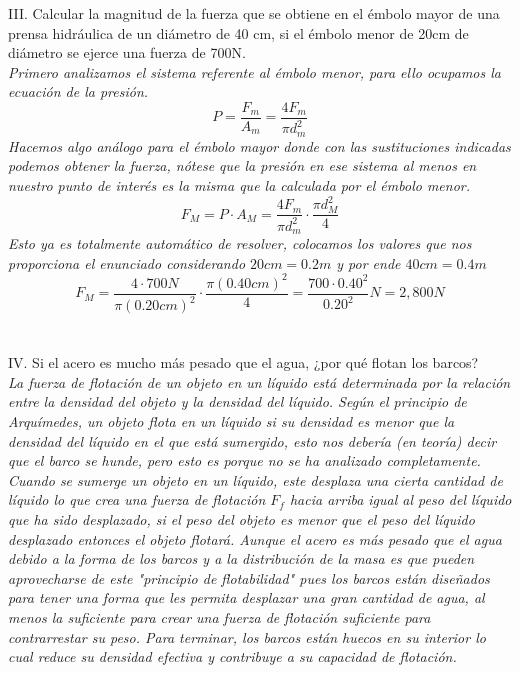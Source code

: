 \documentclass{article}
\begin{document}
III. Calcular la magnitud de la fuerza que se obtiene en el émbolo mayor de una prensa hidráulica de un diámetro de 40 cm, si el émbolo menor de 20cm de diámetro se ejerce una fuerza de 700N. \\
\textit{Primero analizamos el sistema referente al émbolo menor, para ello ocupamos la ecuación de la presión.}
\begin{equation}
    P = \frac{F_m}{A_m} = \frac{4F_m}{\pi d_m^2}
\end{equation}
\textit{Hacemos algo análogo para el émbolo mayor donde con las sustituciones indicadas podemos obtener la fuerza, nótese que la presión en ese sistema al menos en nuestro punto de interés es la misma que la calculada por el émbolo menor.}
\begin{equation*}
    F_M = P \cdot A_M = \frac{4F_m}{\pi d_m^2} \cdot \frac{\pi d_M^2}{4}
\end{equation*}
\textit{Esto ya es totalmente automático de resolver, colocamos los valores que nos proporciona el enunciado considerando $20cm=0.2m$ y por ende $40cm=0.4m$}
\begin{equation*}
    F_M = \frac{4 \cdot 700N}{\pi (0.20cm)^2} \cdot \frac{\pi (0.40cm)^2}{4} = \frac{700 \cdot 0.40^2}{0.20^2} N =  2,800N
\end{equation*}
\\\\
IV. Si el acero es mucho más pesado que el agua, ¿por qué flotan los barcos?\\
\textit{La fuerza de flotación de un objeto en un líquido está determinada por la relación entre la densidad del objeto y la densidad del líquido. Según el principio de Arquímedes, un objeto flota en un líquido si su densidad es menor que la densidad del líquido en el que está sumergido, esto nos debería (en teoría) decir que el barco se hunde, pero esto es porque no se ha analizado completamente. Cuando se sumerge un objeto en un líquido, este desplaza una cierta cantidad de líquido lo que crea una fuerza de flotación $F_f$ hacia arriba igual al peso del líquido que ha sido desplazado, si el peso del objeto es menor que el peso del líquido desplazado entonces el objeto flotará. Aunque el acero es más pesado que el agua debido a la forma de los barcos y a la distribución de la masa es que pueden aprovecharse de este "principio de flotabilidad" pues los barcos están diseñados para tener una forma que les permita desplazar una gran cantidad de agua, al menos la suficiente para crear una fuerza de flotación suficiente para contrarrestar su peso. Para terminar, los barcos están huecos en su interior lo cual reduce su densidad efectiva y contribuye a su capacidad de flotación.}
\end{document}
